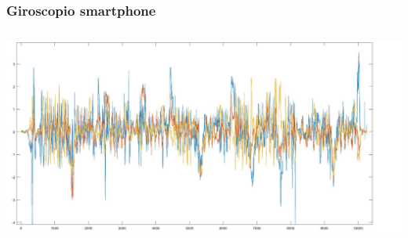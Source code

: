 \documentclass[a4paper]{article}
\begin{document}
\subsubsection{Giroscopio smartphone}
\begin{minipage}{\linewidth}
\begin{center}
\includegraphics[width=160mm, height= 70mm]{./images/registrazione_tesi/gyrXYZ.jpg} 
\end{center}
\end{minipage}
\makebox[\linewidth]{}
\makebox[\linewidth]{}\makebox[\linewidth]{}\makebox[\linewidth]{}
\makebox[\linewidth]{}\makebox[\linewidth]{}\makebox[\linewidth]{}
\makebox[\linewidth]{}\makebox[\linewidth]{}\makebox[\linewidth]{}

\clearpage

\end{document}
